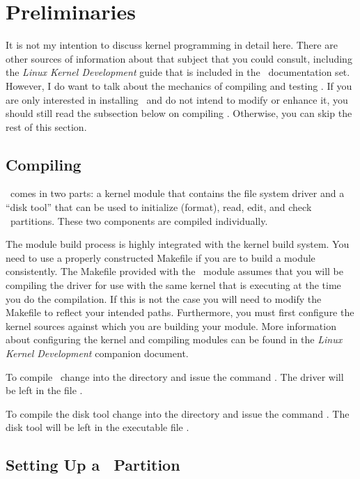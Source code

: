 
\section{Preliminaries}
\label{sec:preliminaries}

It is not my intention to discuss kernel programming in detail here. There are other sources of
information about that subject that you could consult, including the \textit{Linux Kernel
Development} guide that is included in the \GenericFS\ documentation set. However, I do want to
talk about the mechanics of compiling and testing \GenericFS. If you are only interested in
installing \GenericFS\ and do not intend to modify or enhance it, you should still read the
subsection below on compiling \GenericFS. Otherwise, you can skip the rest of this section.

\subsection{Compiling \GenericFS}
\label{sec:compiling}

\GenericFS\ comes in two parts: a kernel module that contains the file system driver and a
``disk tool'' that can be used to initialize (format), read, edit, and check \GenericFS\
partitions. These two components are compiled individually.

The module build process is highly integrated with the kernel build system. You need to use a
properly constructed Makefile if you are to build a module consistently. The Makefile provided
with the \GenericFS\ module assumes that you will be compiling the driver for use with the same
kernel that is executing at the time you do the compilation. If this is not the case you will
need to modify the Makefile to reflect your intended paths. Furthermore, you must first
configure the kernel sources against which you are building your module. More information about
configuring the kernel and compiling modules can be found in the \textit{Linux Kernel
Development} companion document.

To compile \GenericFS\ change into the  directory and issue the command
\command{make}. The driver will be left in the file \filename{genericfs.ko}.

To compile the disk tool change into the  directory and issue the command
\command{make}. The disk tool will be left in the executable file \filename{disktool}.

\subsection{Setting Up a \GenericFS\ Partition}
\label{sec:partition}

